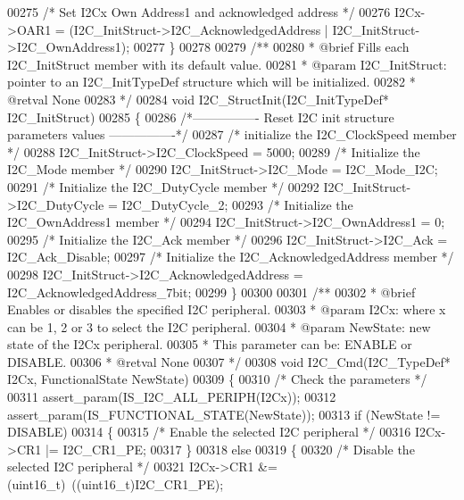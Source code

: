 \begin{DoxyCode}
00275   \textcolor{comment}{/* Set I2Cx Own Address1 and acknowledged address */}
00276   I2Cx->OAR1 = (I2C\_InitStruct->I2C\_AcknowledgedAddress | I2C\_InitStruct->I2C\_OwnAddress1);
00277 \}
00278 
00279 \textcolor{comment}{/**}
00280 \textcolor{comment}{  * @brief  Fills each I2C\_InitStruct member with its default value.}
00281 \textcolor{comment}{  * @param  I2C\_InitStruct: pointer to an I2C\_InitTypeDef structure which will be initialized.}
00282 \textcolor{comment}{  * @retval None}
00283 \textcolor{comment}{  */}
00284 \textcolor{keywordtype}{void} I2C_StructInit(I2C\_InitTypeDef* I2C\_InitStruct)
00285 \{
00286 \textcolor{comment}{/*---------------- Reset I2C init structure parameters values ----------------*/}
00287   \textcolor{comment}{/* initialize the I2C\_ClockSpeed member */}
00288   I2C\_InitStruct->I2C_ClockSpeed = 5000;
00289   \textcolor{comment}{/* Initialize the I2C\_Mode member */}
00290   I2C\_InitStruct->I2C_Mode = I2C_Mode_I2C;
00291   \textcolor{comment}{/* Initialize the I2C\_DutyCycle member */}
00292   I2C\_InitStruct->I2C_DutyCycle = I2C_DutyCycle_2;
00293   \textcolor{comment}{/* Initialize the I2C\_OwnAddress1 member */}
00294   I2C\_InitStruct->I2C_OwnAddress1 = 0;
00295   \textcolor{comment}{/* Initialize the I2C\_Ack member */}
00296   I2C\_InitStruct->I2C_Ack = I2C_Ack_Disable;
00297   \textcolor{comment}{/* Initialize the I2C\_AcknowledgedAddress member */}
00298   I2C\_InitStruct->I2C_AcknowledgedAddress = I2C_AcknowledgedAddress_7bit;
00299 \}
00300 
00301 \textcolor{comment}{/**}
00302 \textcolor{comment}{  * @brief  Enables or disables the specified I2C peripheral.}
00303 \textcolor{comment}{  * @param  I2Cx: where x can be 1, 2 or 3 to select the I2C peripheral.}
00304 \textcolor{comment}{  * @param  NewState: new state of the I2Cx peripheral. }
00305 \textcolor{comment}{  *          This parameter can be: ENABLE or DISABLE.}
00306 \textcolor{comment}{  * @retval None}
00307 \textcolor{comment}{  */}
00308 \textcolor{keywordtype}{void} I2C_Cmd(I2C\_TypeDef* I2Cx, FunctionalState NewState)
00309 \{
00310   \textcolor{comment}{/* Check the parameters */}
00311   assert_param(IS\_I2C\_ALL\_PERIPH(I2Cx));
00312   assert_param(IS\_FUNCTIONAL\_STATE(NewState));
00313   \textcolor{keywordflow}{if} (NewState != DISABLE)
00314   \{
00315     \textcolor{comment}{/* Enable the selected I2C peripheral */}
00316     I2Cx->CR1 |= I2C_CR1_PE;
00317   \}
00318   \textcolor{keywordflow}{else}
00319   \{
00320     \textcolor{comment}{/* Disable the selected I2C peripheral */}
00321     I2Cx->CR1 &= (uint16\_t)~((uint16\_t)I2C_CR1_PE);

\end{DoxyCode}
